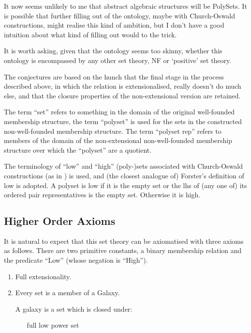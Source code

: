 \documentclass[numreferences]{rbjk}
\begin{document}
\begin{article}
It now seems unlikely to me that abstract algebraic structures will be PolySets.
It is possible that further filling out of the ontology, maybe with Church-Oswald constructions, might realise this kind of ambition, but I don't have a good intuition about what kind of filling out would to the trick.

It is worth asking, given that the ontology seems too skinny, whether this ontology is encompassed by any other set theory, NF or `positive' set theory.

The conjectures are based on the hunch that the final stage in the process described above, in which the relation is extensionalised, really doesn't do much else, and that the closure properties of the non-extensional version are retained.

The term ``set'' refers to something in the domain of the original well-founded membership structure, the term ``polyset'' is used for the sets in the constructed non-well-founded membership structure.
The term ``polyset rep'' refers to members of the domain of the non-extensional non-well-founded membership structure over which the ``polyset'' are a quotient. 

The terminology of ``low'' and ``high'' (poly-)sets associated with Church-Oswald constructions (as in \cite{forster92,forster2005}) is used, and (the closest analogue of) Forster's definition of low is adopted.
A polyset is low if it is the empty set or the lhs of (any one of) its ordered pair representatives is the empty set.
Otherwise it is high.

\subsection{Higher Order Axioms}

It is natural to expect that this set theory can be axiomatised with three axioms as follows.
There are two primitive constants, a binary membership relation and the predicate ``Low'' (whose negation is ``High'').

\begin{enumerate}
\item Full extensionality.

\item Every set is a member of a Galaxy.

A galaxy is a set which is closed under:

\begin{itemize}
\item [full low power set]\ 


\end{itemize}
\end{enumerate}
\end{article}
\end{document}
